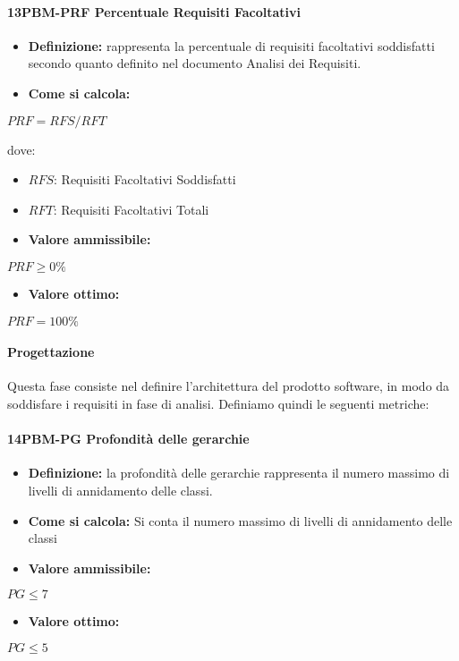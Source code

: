 \paragraph*{13PBM-PRF Percentuale Requisiti Facoltativi}
\begin{itemize}
    \item \textbf{Definizione:} rappresenta la percentuale di requisiti facoltativi soddisfatti secondo quanto definito nel documento Analisi dei Requisiti.
    \item \textbf{Come si calcola:}
\end{itemize}
\begin{center}
   $PRF = RFS/RFT$ 
\end{center}
dove:
\begin{itemize}[label=$\rightarrow$]
    \item $RFS$: Requisiti Facoltativi Soddisfatti
    \item $RFT$: Requisiti Facoltativi Totali
\end{itemize}
\begin{itemize}
    \item \textbf{Valore ammissibile:}
\end{itemize}
\begin{center}
    $PRF \geq 0\%$
\end{center}
\begin{itemize}
    \item \textbf{Valore ottimo:}
\end{itemize}
\begin{center}
    $PRF = 100\%$
\end{center}

\paragraph{Progettazione}
Questa fase consiste nel definire l'architettura  del prodotto software, in modo da soddisfare i requisiti in fase di analisi. Definiamo quindi le seguenti metriche:

\paragraph*{14PBM-PG Profondità delle gerarchie}
\begin{itemize}
    \item \textbf{Definizione:} la profondità delle gerarchie rappresenta il numero massimo di livelli di annidamento delle classi.
    \item \textbf{Come si calcola:} Si conta il numero massimo di livelli di annidamento delle classi
\end{itemize}
\begin{itemize}
    \item \textbf{Valore ammissibile:}
\end{itemize}
\begin{center}
    $PG \leq 7$
\end{center}
\begin{itemize}
    \item \textbf{Valore ottimo:}
\end{itemize}
\begin{center}
    $PG \leq 5$
\end{center}

